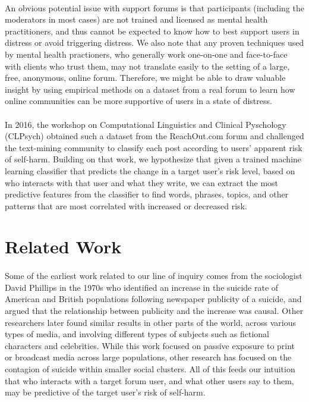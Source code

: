 \documentclass{article}
\begin{document}
\paragraph{}An obvious potential issue with support forums is that participants (including the moderators in most cases) are not trained and licensed as mental health practitioners, and thus cannot be expected to know how to best support users in distress or avoid triggering distress. We also note that any proven techniques used by mental health practioners, who generally work one-on-one and face-to-face with clients who trust them, may not translate easily to the setting of a large, free, anonymous, online forum. Therefore, we might be able to draw valuable insight by using empirical methods on a dataset from a real forum to learn how online communities can be more supportive of users in a state of distress.

\paragraph{}In 2016, the workshop on Computational Linguistics and Clinical Pyschology (CLPsych) obtained such a dataset from the ReachOut.com forum and challenged the text-mining community to classify each post according to users' apparent risk of self-harm\cite{milne}. Building on that work, we hypothesize that given a trained machine learning classifier that predicts the change in a target user's risk level, based on who interacts with that user and what they write, we can extract the most predictive features from the classifier to find words, phrases, topics, and other patterns that are most correlated with increased or decreased risk.

\section{Related Work}

\paragraph{}Some of the earliest work related to our line of inquiry comes from the sociologist David Phillips in the 1970s who identified an increase in the suicide rate of American and British populations following newspaper publicity of a suicide, and argued that the relationship between publicity and the increase was causal\cite{phillips}. Other researchers later found similar results in other parts of the world\cite{gladwell}\cite{jonas}\cite{ishii}\cite{cheng}\cite{sonneck}, across various types of media, and involving different types of subjects such as fictional characters and celebrities\cite{stack}. While this work focused on passive exposure to print or broadcast media across large populations, other research has focused on the contagion of suicide within smaller social clusters\cite{gould1}\cite{gould2}\cite{haw}\cite{brent}. All of this feeds our intuition that who interacts with a target forum user, and what other users say to them, may be predictive of the target user's risk of self-harm.
\end{document}
